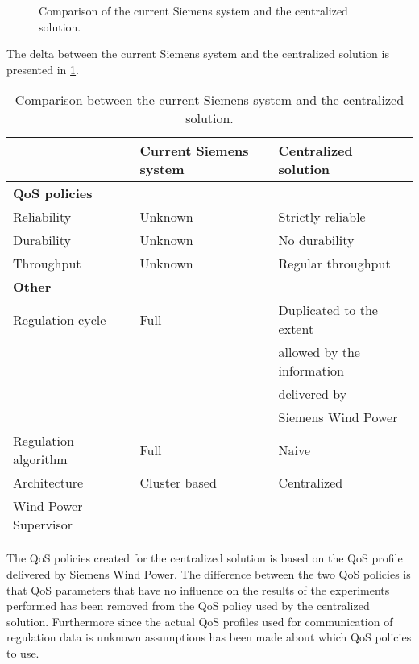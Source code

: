 \begin{figure}
	\centering
	
	\caption[Comparison of the current Siemens system and the centralized solution]{
		\label{fig:projectDiffOverviewCentralizedSiemens}
		\footnotesize{%
			Comparison of the current Siemens system and the centralized solution.
		}
	}
\end{figure}

\FloatBarrier

The delta between the current Siemens system and the centralized solution is presented in \cref{tab:centralizedVSsiemens}.

\begin{table}
	\begin{tabular}{l l l}
		\hline
		\hline
		~ & \textbf{Current Siemens system} & \textbf{Centralized solution} \\
		\hline
		\hline
		\multicolumn{3}{l}{\textbf{QoS policies}} \\
		\hline
		Reliability & Unknown & Strictly reliable \\
		\hline
		Durability & Unknown & No durability \\
		\hline
		Throughput & Unknown & Regular throughput \\
		\hline
		\hline
		\multicolumn{3}{l}{\textbf{Other}} \\
		\hline
		\hline
		Regulation cycle & Full & Duplicated to the extent\\
		~ & ~ & allowed by the information\\
		~ & ~ & delivered by\\
		~ & ~ & Siemens Wind Power\\
		\hline
		Regulation algorithm & Full & Naive \\
		\hline
		Architecture & Cluster based & Centralized \\
		\hline
		Wind Power Supervisor & \checkmark & \text{x} \\
		\hline
		\hline
	\end{tabular}
	
	\caption[Comparison between the current Siemens system and the centralized solution]{
		\label{tab:centralizedVSsiemens}
		\footnotesize{%
			Comparison between the current Siemens system and the centralized solution.
		} 
	}
\end{table}

The QoS policies created for the centralized solution is based on the QoS profile delivered by Siemens Wind Power. The difference between the two QoS policies is that QoS parameters that have no influence on the results of the experiments performed has been removed from the QoS policy used by the centralized solution. Furthermore since the actual QoS profiles used for communication of regulation data is unknown assumptions has been made about which QoS policies to use.

